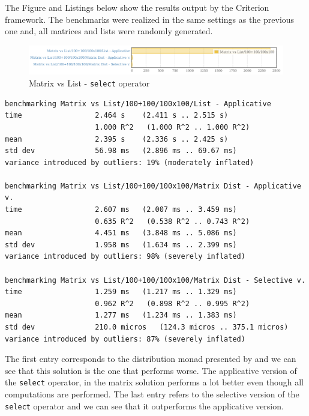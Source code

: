 \documentclass[
  oneside,
  11pt, a4paper,
  footinclude=true,
  headinclude=true,
  cleardoublepage=empty
]{scrbook}
\theoremstyle{definition}
\theoremstyle{definition}
\begin{document}
        The Figure and Listings below show the results output by the Criterion framework. The benchmarks were realized in the same settings as the previous one and, all matrices and lists were randomly generated.
        
            \begin{figure}[H]%
            \centering
             \includegraphics[width=\linewidth]{img/matrixVlist.png}
               \caption{Matrix vs List - \texttt{select} operator}
               \label{fig:bench2}
            \end{figure}
            
        \begin{lstlisting}[caption={Results}, captionpos=b]
benchmarking Matrix vs List/100+100/100x100/List - Applicative
time                 2.464 s    (2.411 s .. 2.515 s)
                     1.000 R^2   (1.000 R^2 .. 1.000 R^2)
mean                 2.395 s    (2.336 s .. 2.425 s)
std dev              56.98 ms   (2.896 ms .. 69.67 ms)
variance introduced by outliers: 19% (moderately inflated)

benchmarking Matrix vs List/100+100/100x100/Matrix Dist - Applicative v.
time                 2.607 ms   (2.007 ms .. 3.459 ms)
                     0.635 R^2   (0.538 R^2 .. 0.743 R^2)
mean                 4.451 ms   (3.848 ms .. 5.086 ms)
std dev              1.958 ms   (1.634 ms .. 2.399 ms)
variance introduced by outliers: 98% (severely inflated)

benchmarking Matrix vs List/100+100/100x100/Matrix Dist - Selective v.
time                 1.259 ms   (1.217 ms .. 1.329 ms)
                     0.962 R^2   (0.898 R^2 .. 0.995 R^2)
mean                 1.277 ms   (1.234 ms .. 1.383 ms)
std dev              210.0 micros   (124.3 micros .. 375.1 micros)
variance introduced by outliers: 87% (severely inflated)
        \end{lstlisting}{}
        
        The first entry corresponds to the distribution monad presented by \cite{erwig_kollmansberger_2006} and we can see that this solution is the one that performs worse. The applicative version of the \texttt{select} operator, in the matrix solution performs a lot better even though all computations are performed. The last entry refers to the selective version of the \texttt{select} operator and we can see that it outperforms the applicative version.
        
\end{document}
